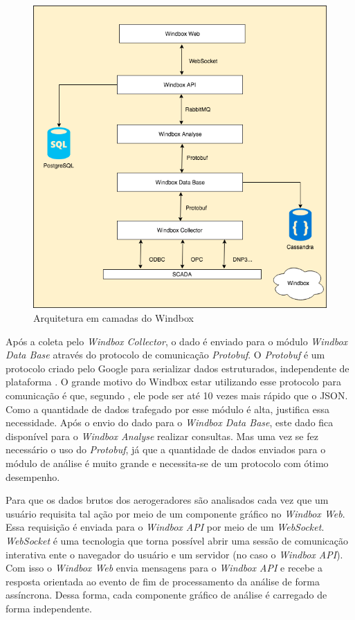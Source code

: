 \begin{figure}[htbp!] \begin{center}
\includegraphics[width=0.75\linewidth]{./figuras/arquitetura-windbox}
\caption{Arquitetura em camadas do Windbox}
\label{Fig:arquiteturaWindbox}
\end{center} 
\end{figure}

Após a coleta pelo \textit{Windbox Collector}, o dado é enviado para o módulo \textit{Windbox Data Base} através do protocolo de comunicação \textit{Protobuf}. O \textit{Protobuf} é um protocolo criado pelo Google para serializar dados estruturados, independente de plataforma \cite{protobuf-google}. O grande motivo do Windbox estar utilizando esse protocolo para comunicação é que, segundo , ele pode ser até 10 vezes mais rápido que o JSON. Como a quantidade de dados trafegado por esse módulo é alta, justifica essa necessidade. Após o envio do dado para o \textit{Windbox Data Base}, este dado fica disponível para o \textit{Windbox Analyse} realizar consultas. Mas uma vez se fez necessário o uso do \textit{Protobuf}, já que a quantidade de dados enviados para o módulo de análise é muito grande e necessita-se de um protocolo com ótimo desempenho.

Para que os dados brutos dos aerogeradores são analisados cada vez que um usuário requisita tal ação por meio de um componente gráfico no \textit{Windbox Web}. Essa requisição é enviada para o \textit{Windbox API} por meio de um \textit{WebSocket}. \textit{WebSocket} é uma tecnologia que torna possível abrir uma sessão de comunicação interativa ente o navegador do usuário e um servidor (no caso o \textit{Windbox API}). Com isso o \textit{Windbox Web} envia mensagens para o \textit{Windbox API} e recebe a resposta orientada ao evento de fim de processamento da análise de forma assíncrona. Dessa forma, cada componente gráfico de análise é carregado de forma independente. 

